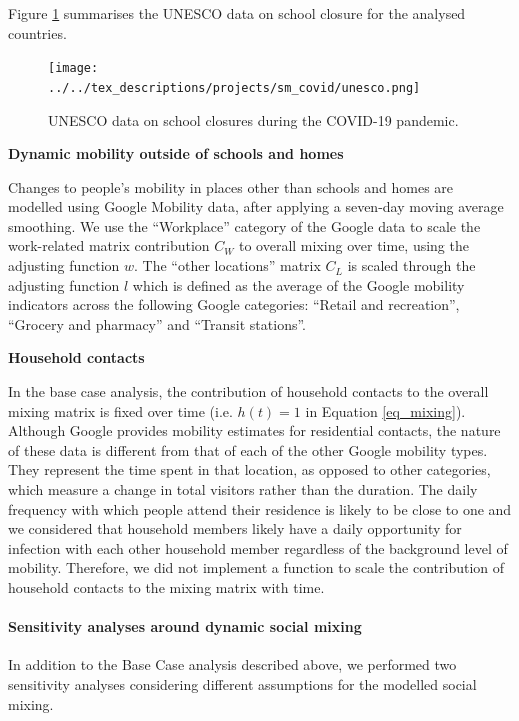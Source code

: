 Figure \ref{fig:unesco} summarises the UNESCO data on school closure for the analysed countries.

\begin{figure}[p]
  \begin{center}
  \texttt{[image: ../../tex\_descriptions/projects/sm\_covid/unesco.png]}
  \end{center}
  \caption{UNESCO data on school closures during the COVID-19 pandemic.
  } 
  \label{fig:unesco}
\end{figure}

\vspace{5pt}
\textbf{Dynamic mobility outside of schools and homes}

Changes to people's mobility in places other than schools and homes are modelled using Google Mobility data, after applying a seven-day moving average smoothing. We use the ``Workplace''
category of the Google data to scale the work-related matrix contribution $C_W$ to overall mixing over time, using the adjusting function
$w$. The ``other locations'' matrix $C_L$ is scaled through the adjusting function $l$ which is defined as the average of the Google mobility
indicators across the following Google categories: ``Retail and recreation'', ``Grocery and pharmacy'' and ``Transit stations''.

\vspace{5pt}
\textbf{Household contacts}

In the base case analysis, the contribution of household contacts to the overall mixing matrix is fixed over time 
(i.e. $h(t) = 1$ in Equation \ref{eq_mixing}). Although Google provides mobility 
estimates for residential contacts, the nature of these data is different from that of each of the other Google mobility 
types. They represent the time spent in that location, as opposed to other categories, which measure a change in total visitors 
rather than the duration. The daily frequency with which people attend their residence is likely to be close to one and we 
considered that household members likely have a daily opportunity for infection with each other household member regardless of
the background level of mobility. Therefore, we did not implement a function to scale the contribution of household contacts 
to the mixing matrix with time.

\paragraph{Sensitivity analyses around dynamic social mixing}
In addition to the Base Case analysis described above, we performed two sensitivity analyses considering
different assumptions for the modelled social mixing.

